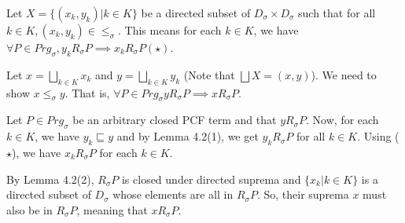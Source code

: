 Let $X = \{ (x_k, y_k) | k \in K \}$ be a directed subset of $D_\sigma \times D_\sigma$ such that for all $k \in K, (x_k, y_k) \in \leq_\sigma$.
This means for each $k \in K$, we have $\forall P \in Prg_\sigma, y_k R_\sigma P \implies x_k R_\sigma P (\star)$.

Let $x = \bigsqcup_{k \in K} x_k$ and $y = \bigsqcup_{k \in K} y_k$ (Note that $\bigsqcup X = (x,y)$). We need to show $x \leq_\sigma y$. That is, $\forall P \in Prg_\sigma y R_\sigma P \implies x R_\sigma P$.

Let $P \in Prg_\sigma$ be an arbitrary closed PCF term and that $y R_\sigma P$. 
Now, for each $k \in K$, we have $y_k \sqsubseteq y$ and by Lemma 4.2(1), we get $y_k R_\sigma P$ for all $k \in K$. Using ($\star$), we have $x_k R_\sigma P$ for each $k \in K$. 

By Lemma 4.2(2), $R_\sigma P$ is closed under directed suprema and $\{ x_k | k \in K \}$ is a directed subset of $D_\sigma$ whose elements are all in $R_\sigma P$. So, their suprema $x$ must also be in $R_\sigma P$, meaning that $x R_\sigma P$.